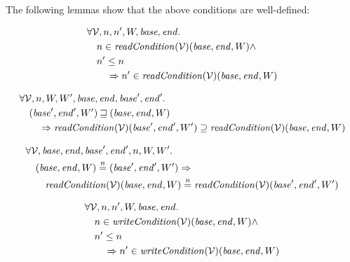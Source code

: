 \documentclass[a4paper]{article}
\newcommand{\nequal}[1][n]{\stackrel{\tiny{#1}}{=}}
\newcommand{\var}[1]{\mathit{#1}}
\newcommand{\start}{\var{base}}
\newcommand{\addrend}{\var{end}}
\newcommand{\plainfun}[2]{
  \ifthenelse{\equal{#2}{}}
             {\mathit{#1}}
             {\mathit{#1}(#2)}
}
\newcommand{\readCond}[1]{\plainfun{readCondition}{#1}}
\newcommand{\writeCond}[1]{\plainfun{writeCondition}{#1}}
\newcommand{\future}{\mathbin{\sqsupseteq}}
\newcommand{\asmType}{\plaindom{AsmType}}
\newcommand{\plaindom}[1]{\mathrm{#1}}
\newcommand{\intr}[2]{\mathcal{#1}}
\newcommand{\valueintr}[1]{\intr{V}{#1}}
\newcommand{\stdvr}{\valueintr{\asmType}}
\begin{document}
The following lemmas show that the above conditions are well-defined:
\begin{lemma}
\label{lem:rc-dc}
  \begin{align*}
    &\forall \stdvr, n,n',W,\start, \addrend \ldotp \\
    &\quad  n \in \readCond{}(\stdvr)(\start,\addrend,W) \land \\
    &\quad  n' \leq n \\
    &\qquad \Rightarrow n' \in \readCond{}(\stdvr)(\start,\addrend,W)
  \end{align*}
\end{lemma}

\begin{lemma}
\label{lem:rc-mono-world}
  \begin{align*}
    &\forall \stdvr, n,W,W',\start, \addrend, \start',\addrend' \ldotp \\
    &\quad  (\start',\addrend',W') \future (\start,\addrend,W) \\
    &\qquad \Rightarrow \readCond{}(\stdvr)(\start',\addrend',W') \supseteq \readCond{}(\stdvr)(\start,\addrend,W)
  \end{align*}
\end{lemma}

\begin{lemma}
\label{lem:rc-ne-world}
  \begin{align*}
    & \forall \stdvr, \start, \addrend, \start', \addrend', n, W, W' \ldotp \\
    & \quad (\start, \addrend,W) \nequal (\start', \addrend',W') \Rightarrow \\
    & \qquad \readCond{}(\stdvr)(\start, \addrend,W) \nequal \readCond{}(\stdvr)(\start', \addrend',W')\\
  \end{align*}
\end{lemma}

\begin{lemma}
\label{lem:wc-dc}
  \begin{align*}
    &\forall \stdvr, n,n',W,\start, \addrend \ldotp \\
    &\quad  n \in \writeCond{}(\stdvr)(\start,\addrend,W) \land \\
    &\quad  n' \leq n \\
    &\qquad \Rightarrow n' \in \writeCond{}(\stdvr)(\start,\addrend,W)
  \end{align*}
\end{lemma}
\end{document}
